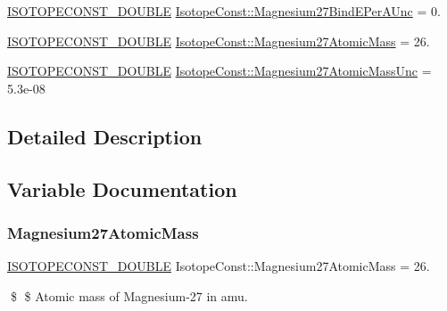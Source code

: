 \begin{DoxyCompactItemize}
\mbox{\hyperlink{group___isotope_const-_macros_ga8f45a7272ce02c0b4c65c44636ed719a}{I\+S\+O\+T\+O\+P\+E\+C\+O\+N\+S\+T\+\_\+\+D\+O\+U\+B\+LE}} \mbox{\hyperlink{group___isotope_const-_magnesium-_mg27_ga964ea0d5354f00ccb579043b7bf33c47}{Isotope\+Const\+::\+Magnesium27\+Bind\+E\+Per\+A\+Unc}} = 0.
\item 
\mbox{\hyperlink{group___isotope_const-_macros_ga8f45a7272ce02c0b4c65c44636ed719a}{I\+S\+O\+T\+O\+P\+E\+C\+O\+N\+S\+T\+\_\+\+D\+O\+U\+B\+LE}} \mbox{\hyperlink{group___isotope_const-_magnesium-_mg27_ga7d1730529d267cef6e47d96df55c801e}{Isotope\+Const\+::\+Magnesium27\+Atomic\+Mass}} = 26.
\item 
\mbox{\hyperlink{group___isotope_const-_macros_ga8f45a7272ce02c0b4c65c44636ed719a}{I\+S\+O\+T\+O\+P\+E\+C\+O\+N\+S\+T\+\_\+\+D\+O\+U\+B\+LE}} \mbox{\hyperlink{group___isotope_const-_magnesium-_mg27_gab6e40b7b2bcc606d8024a5c0bbc0ac59}{Isotope\+Const\+::\+Magnesium27\+Atomic\+Mass\+Unc}} = 5.\+3e-\/08
\end{DoxyCompactItemize}


\subsection{Detailed Description}


\subsection{Variable Documentation}
\mbox{\label{group___isotope_const-_magnesium-_mg27_ga7d1730529d267cef6e47d96df55c801e}} 
\subsubsection{\texorpdfstring{Magnesium27\+Atomic\+Mass}{Magnesium27AtomicMass}}
{\footnotesize\ttfamily \mbox{\hyperlink{group___isotope_const-_macros_ga8f45a7272ce02c0b4c65c44636ed719a}{I\+S\+O\+T\+O\+P\+E\+C\+O\+N\+S\+T\+\_\+\+D\+O\+U\+B\+LE}} Isotope\+Const\+::\+Magnesium27\+Atomic\+Mass = 26.}

\$ \$ Atomic mass of Magnesium-\/27 in amu. \mbox{\label{group___isotope_const-_magnesium-_mg27_gab6e40b7b2bcc606d8024a5c0bbc0ac59}} 
